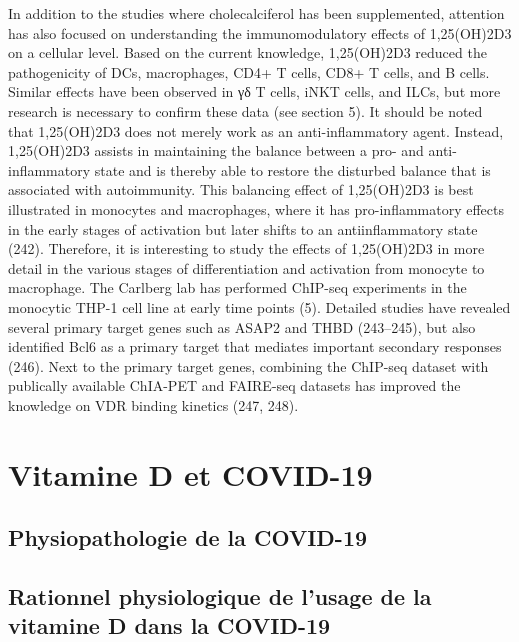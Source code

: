 \documentclass[
  a4paper,
  DIV=11,
  numbers=noendperiod,
  listof=totoc]{scrreprt}
\begin{document}
In addition to the studies where cholecalciferol has been supplemented,
attention has also focused on understanding the immunomodulatory effects
of 1,25(OH)2D3 on a cellular level. Based on the current knowledge,
1,25(OH)2D3 reduced the pathogenicity of DCs, macrophages, CD4+ T cells,
CD8+ T cells, and B cells. Similar effects have been observed in γδ T
cells, iNKT cells, and ILCs, but more research is necessary to confirm
these data (see section 5). It should be noted that 1,25(OH)2D3 does not
merely work as an anti-inflammatory agent. Instead, 1,25(OH)2D3 assists
in maintaining the balance between a pro- and anti-inflammatory state
and is thereby able to restore the disturbed balance that is associated
with autoimmunity. This balancing effect of 1,25(OH)2D3 is best
illustrated in monocytes and macrophages, where it has pro-inflammatory
effects in the early stages of activation but later shifts to an
antiinflammatory state (242). Therefore, it is interesting to study the
effects of 1,25(OH)2D3 in more detail in the various stages of
differentiation and activation from monocyte to macrophage. The Carlberg
lab has performed ChIP-seq experiments in the monocytic THP-1 cell line
at early time points (5). Detailed studies have revealed several primary
target genes such as ASAP2 and THBD (243--245), but also identified Bcl6
as a primary target that mediates important secondary responses (246).
Next to the primary target genes, combining the ChIP-seq dataset with
publically available ChIA-PET and FAIRE-seq datasets has improved the
knowledge on VDR binding kinetics (247, 248).

\newpage{}

\hypertarget{vitamine-d-et-covid-19}{%
\chapter{Vitamine D et COVID-19}\label{vitamine-d-et-covid-19}}

\hypertarget{physiopathologie-de-la-covid-19}{%
\section{Physiopathologie de la
COVID-19}\label{physiopathologie-de-la-covid-19}}

\hypertarget{rationnel-physiologique-de-lusage-de-la-vitamine-d-dans-la-covid-19}{%
\section{Rationnel physiologique de l'usage de la vitamine D dans la
COVID-19}\label{rationnel-physiologique-de-lusage-de-la-vitamine-d-dans-la-covid-19}}
\end{document}
